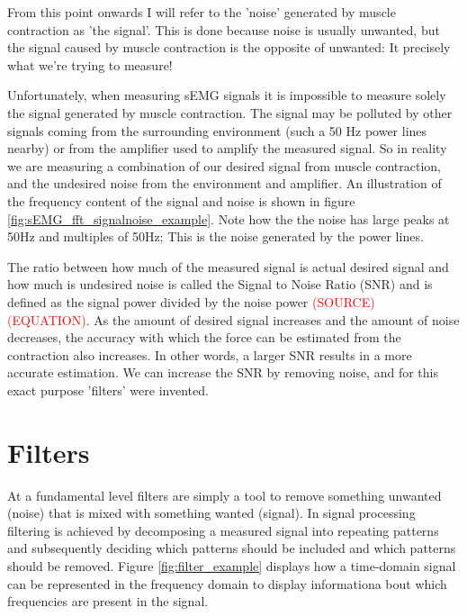 From this point onwards I will refer to the 'noise' generated by muscle contraction as 'the signal'. This is done because noise is usually unwanted, but the signal caused by muscle contraction is the opposite of unwanted: It precisely what we're trying to measure! 

Unfortunately, when measuring sEMG signals it is impossible to measure solely the signal generated by muscle contraction. The signal may be polluted by other signals coming from the surrounding environment (such a 50 Hz power lines nearby) or from the amplifier used to amplify the measured signal. So in reality we are measuring a combination of our desired signal from muscle contraction, and the undesired noise from the environment and amplifier. An illustration of the frequency content of the signal and noise is shown in figure \ref{fig:sEMG_fft_signalnoise_example}. Note how the the noise has large peaks at 50Hz and multiples of 50Hz; This is the noise generated by the power lines. 

The ratio between how much of the measured signal is actual desired signal and how much is undesired noise is called the Signal to Noise Ratio (SNR) and is defined as the signal power divided by the noise power \textcolor{red}{(SOURCE) (EQUATION)}. As the amount of desired signal increases and the amount of noise decreases, the accuracy with which the force can be estimated from the contraction also increases. In other words, a larger SNR results in a more accurate estimation. We can increase the SNR by removing noise, and for this exact purpose 'filters' were invented.

\section{Filters}
At a fundamental level filters are simply a tool to remove something unwanted (noise) that is mixed with something wanted (signal). In signal processing filtering is achieved by decomposing a measured signal into repeating patterns and subsequently deciding which patterns should be included and which patterns should be removed. Figure \ref{fig:filter_example} displays how a time-domain signal can be represented in the frequency domain to display informationa bout which frequencies are present in the signal.

